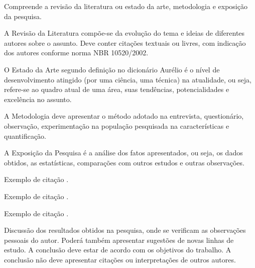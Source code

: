 \documentclass{abntpuc}
\begin{document}

\iniciocapitulo
Compreende a revisão da literatura ou estado da arte, metodologia e exposição da pesquisa.\par

A Revisão da Literatura compõe-se da evolução do tema e ideias de diferentes autores sobre o assunto. Deve conter citações textuais ou livres, com indicação dos autores conforme norma NBR 10520/2002.\par

O Estado da Arte segundo definição no dicionário Aurélio é o nível de desenvolvimento atingido (por uma ciência, uma técnica) na atualidade, ou seja, refere-se ao quadro atual de uma área, suas tendências, potencialidades e excelência no assunto.\par

A Metodologia deve apresentar o método adotado na entrevista, questionário, observação, experimentação na população pesquisada na características e quantificação.\par

A Exposição da Pesquisa é a análise dos fatos apresentados, ou seja, os dados obtidos, as estatísticas, comparações com outros estudos e outras observações.\par


Exemplo de citação \cite{knuth68}.

Exemplo de citação \cite{knuth69}.

Exemplo de citação \cite{knuth73}.




\iniciocapitulo
Discussão dos resultados obtidos na pesquisa, onde se verificam as observações pessoais do autor. Poderá também apresentar sugestões de novas linhas de estudo. A conclusão deve estar de acordo com os objetivos do trabalho. A conclusão não deve apresentar citações ou interpretações de outros autores.



\end{document}
